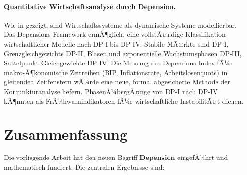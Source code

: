 ﻿\documentclass[12pt, a4paper]{article}
\theoremstyle{definition}
\theoremstyle{remark}
\begin{document}
\paragraph{Quantitative Wirtschaftsanalyse durch Depension.}
Wie in \citet{epp2026sysstate} gezeigt, sind Wirtschaftssysteme als dynamische
Systeme modellierbar. Das Depensions-Framework ermÃ¶glicht eine vollstÃ¤ndige
Klassifikation wirtschaftlicher Modelle nach DP-I bis DP-IV: Stabile MÃ¤rkte sind
DP-I, Grenzgleichgewichte DP-II, Blasen und exponentielle Wachstumsphasen DP-III,
Sattelpunkt-Gleichgewichte DP-IV. Die Messung des Depensions-Index fÃ¼r makro-Ã¶konomische
Zeitreihen (BIP, Inflationsrate, Arbeitslosenquote) in gleitenden Zeitfenstern wÃ¼rde
eine neue, formal abgesicherte Methode der Konjunkturanalyse liefern. PhasenÃ¼bergÃ¤nge
von DP-I nach DP-IV kÃ¶nnten als FrÃ¼hwarnindikatoren fÃ¼r wirtschaftliche InstabilitÃ¤t
dienen.

\section{Zusammenfassung}
\label{sec:zusammenfassung}

Die vorliegende Arbeit hat den neuen Begriff \textbf{Depension} eingefÃ¼hrt und
mathematisch fundiert. Die zentralen Ergebnisse sind:
\end{document}
